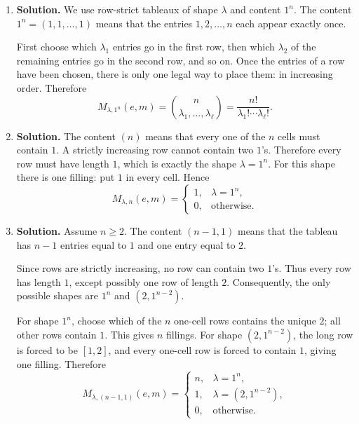 \documentclass{article}
\begin{document}
\begin{enumerate}
\begin{enumerate}
\begin{enumerate}
\item If $3$ and $4$ are in different long rows and have different
companions, choose which long row contains $3$ in $2$ ways and choose
which exceptional entry is paired with $1$ in $2$ ways.  The one-cell
rows contain $1,1,2,2$, so this gives
\[
2\cdot2\cdot\frac{4!}{2!2!}=24.
\]
\end{enumerate}
Thus this case contributes $12+16+24=52$.
\end{enumerate}

Adding the three cases, we obtain
\[
\boxed{M_{(2^2,1^4),(3^2,1^2)}(e,m)=24+96+52=172.}
\]

\item \textbf{Solution.}
We use row-strict tableaux of shape $\lambda$ and content $1^n$.
The content $1^n=(1,1,\ldots,1)$ means that the entries
$1,2,\ldots,n$ each appear exactly once.

First choose which $\lambda_1$ entries go in the first row, then which
$\lambda_2$ of the remaining entries go in the second row, and so on.
Once the entries of a row have been chosen, there is only one legal way
to place them: in increasing order.  Therefore
\[
\boxed{M_{\lambda,1^n}(e,m)
=\binom{n}{\lambda_1,\ldots,\lambda_\ell}
=\frac{n!}{\lambda_1!\cdots\lambda_\ell!}.}
\]

\item \textbf{Solution.}
The content $(n)$ means that every one of the $n$ cells must contain
$1$.  A strictly increasing row cannot contain two $1$'s.  Therefore
every row must have length $1$, which is exactly the shape
$\lambda=1^n$.  For this shape there is one filling: put $1$ in every
cell.  Hence
\[
\boxed{M_{\lambda,n}(e,m)=
\begin{cases}
1,&\lambda=1^n,\\
0,&\text{otherwise}.
\end{cases}}
\]

\item \textbf{Solution.}
Assume $n\geq2$.  The content $(n-1,1)$ means that the tableau has
$n-1$ entries equal to $1$ and one entry equal to $2$.

Since rows are strictly increasing, no row can contain two $1$'s.
Thus every row has length $1$, except possibly one row of length $2$.
Consequently, the only possible shapes are $1^n$ and
$(2,1^{n-2})$.

For shape $1^n$, choose which of the $n$ one-cell rows contains the
unique $2$; all other rows contain $1$.  This gives $n$ fillings.  For
shape $(2,1^{n-2})$, the long row is forced to be $[1,2]$, and every
one-cell row is forced to contain $1$, giving one filling.  Therefore
\[
\boxed{M_{\lambda,(n-1,1)}(e,m)=
\begin{cases}
n,&\lambda=1^n,\\
1,&\lambda=(2,1^{n-2}),\\
0,&\text{otherwise}.
\end{cases}}
\]


\end{enumerate}
\end{document}

